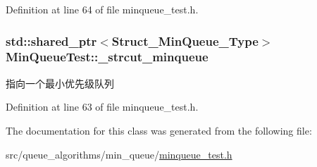Definition at line 64 of file minqueue\+\_\+test.\+h.

\hypertarget{class_min_queue_test_aed079eb9c6dd8460cc785b0fc6088a97}{}
\subsubsection[{\+\_\+strcut\+\_\+minqueue}]{\setlength{\rightskip}{0pt plus 5cm}std\+::shared\+\_\+ptr$<${\bf Struct\+\_\+\+Min\+Queue\+\_\+\+Type}$>$ Min\+Queue\+Test\+::\+\_\+strcut\+\_\+minqueue\hspace{0.3cm}{\ttfamily [protected]}}\label{class_min_queue_test_aed079eb9c6dd8460cc785b0fc6088a97}
指向一个最小优先级队列 

Definition at line 63 of file minqueue\+\_\+test.\+h.



The documentation for this class was generated from the following file\+:\begin{DoxyCompactItemize}
\item 
src/queue\+\_\+algorithms/min\+\_\+queue/\hyperlink{minqueue__test_8h}{minqueue\+\_\+test.\+h}\end{DoxyCompactItemize}
